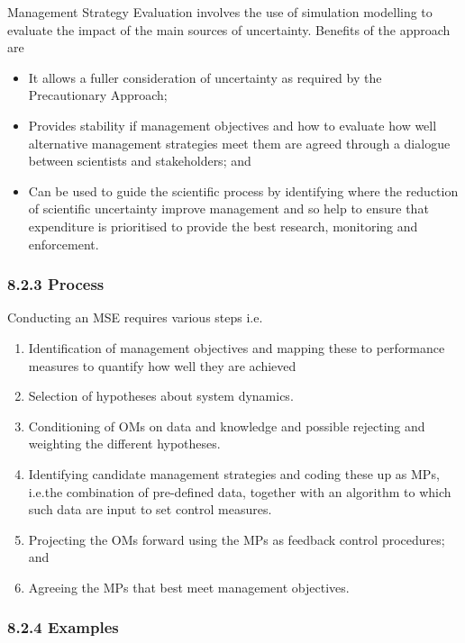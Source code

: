 \documentclass[a4paper,10pt]{article}
\begin{document}
Management Strategy Evaluation involves the use of simulation modelling to evaluate the impact of the main sources of uncertainty.
Benefits of the approach are 

  \begin{itemize} %
     \item It allows a fuller consideration of uncertainty as required by the Precautionary Approach; 
     \item Provides stability if management objectives and how to evaluate how well alternative  
	   management strategies meet them are agreed through a dialogue between scientists and stakeholders; and 
     \item Can be used to guide the scientific process by identifying where the reduction of scientific 
	   uncertainty improve management and so help to ensure that expenditure is prioritised to provide 
	   the best research, monitoring and enforcement. 
  \end{itemize}

\subsubsection*{8.2.3 Process}
  Conducting an MSE requires various steps i.e.
  
  \begin{enumerate} %
    \item Identification of management objectives and mapping these to performance measures to quantify how well they are achieved\
    \item Selection of hypotheses about system dynamics.
    \item Conditioning of OMs on data and knowledge and possible rejecting and weighting the different hypotheses.
    \item Identifying candidate management strategies and coding these up as MPs, i.e.the combination of pre-defined data, 
	  together with an algorithm to which such data are input to set control measures.
    \item Projecting the OMs forward using the MPs as feedback control procedures; and
    \item Agreeing the MPs that best meet management objectives.
\end{enumerate}

\subsubsection*{8.2.4 Examples}
\end{document}
